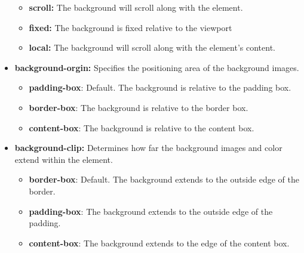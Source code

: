 \documentclass{report}
\begin{document}
\begin{itemize}
\begin{itemize}
                \item \textbf{scroll:} The background will scroll along with the element.
                \item \textbf{fixed:} The background is fixed relative to the viewport
                \item \textbf{local:} The background will scroll along with the element's content.
            \end{itemize}
        \item \textbf{background-orgin:} Specifies the positioning area of the background images.
            \begin{itemize}
                \item \textbf{padding-box}: Default. The background is relative to the padding box.
                \item \textbf{border-box}: The background is relative to the border box.
                \item \textbf{content-box}: The background is relative to the content box.
            \end{itemize}
        \item \textbf{background-clip:} Determines how far the background images and color extend within the element.
            \begin{itemize}
                \item \textbf{border-box}: Default. The background extends to the outside edge of the border.
                \item \textbf{padding-box}: The background extends to the outside edge of the padding.
                \item \textbf{content-box}: The background extends to the edge of the content box.
            \end{itemize}
    \end{itemize}





    \pagebreak \bigbreak \noindent 
\end{document}
